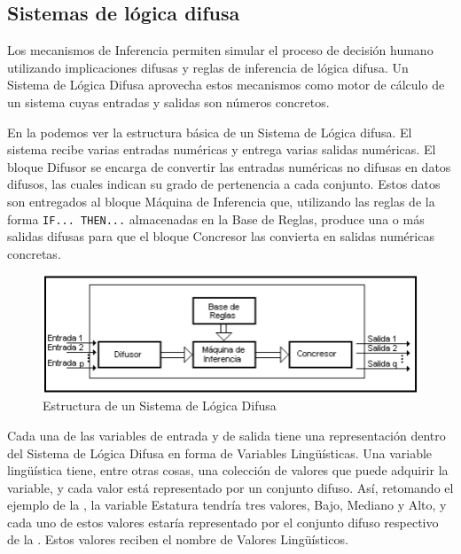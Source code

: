 \subsection{Sistemas de lógica difusa}
Los mecanismos de Inferencia permiten simular el proceso de decisión humano utilizando implicaciones difusas y reglas de inferencia de lógica difusa. Un Sistema de Lógica Difusa aprovecha estos mecanismos como motor de cálculo de un sistema cuyas entradas y salidas son números concretos.

En la  podemos ver la estructura básica de un Sistema de Lógica difusa. El
sistema recibe varias entradas numéricas y entrega varias salidas numéricas. El bloque Difusor
se encarga de convertir las entradas numéricas no difusas en datos difusos, las cuales indican su grado de pertenencia a cada conjunto.
Estos datos son entregados al bloque Máquina de Inferencia que, utilizando las reglas de la forma \texttt{IF... THEN...} almacenadas en la Base de Reglas, produce una o más salidas difusas para que el bloque Concresor las convierta en salidas numéricas concretas.

\begin{figure}[H]
	\centering
	\includegraphics[scale=0.67]{images/sistemas_difusos.png}
	\caption{Estructura de un Sistema de Lógica Difusa}
	\label{fig:sistemas_difusos}
\end{figure}


Cada una de las variables de entrada y de salida tiene una representación
dentro del Sistema de Lógica Difusa en forma de Variables Lingüísticas. Una
variable lingüística tiene, entre otras cosas, una colección de valores que
puede adquirir la variable, y cada valor está representado por un conjunto
difuso. Así, retomando el ejemplo de la , la variable Estatura tendría
tres valores, Bajo, Mediano y Alto, y cada uno de estos valores estaría
representado por el conjunto difuso respectivo de la . Estos valores
reciben el nombre de Valores Lingüísticos.